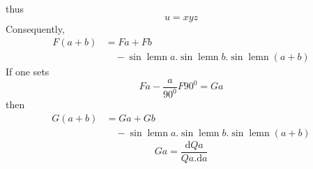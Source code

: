 thus
\[
u=xyz
\]
Consequently,
\[
\begin{aligned}F(a+b)&=Fa+Fb\\[7pt]&\quad{}-\sin\operatorname{lemn}a.\sin\operatorname{lemn}b.\sin\operatorname{lemn}(a+b)\end{aligned}
\]
If one sets
\[
Fa-\frac{a}{90^0}F90^0=Ga
\]
then
\[
\begin{aligned}G(a+b)&=Ga+Gb\\[7pt]&\quad{}-\sin\operatorname{lemn}a.\sin\operatorname{lemn}b.\sin\operatorname{lemn}(a+b)\end{aligned}
\]
\[
Ga=\frac{\mathrm dQa}{Qa.\mathrm da}
\]

\clearpage
\endgroup
